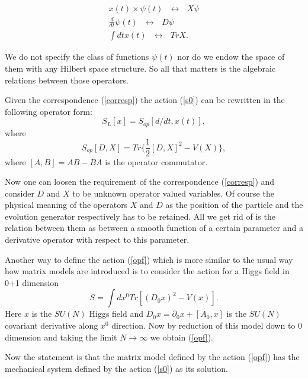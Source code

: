 \documentclass[a4paper,11pt]{article}
\begin{document}
\begin{eqnarray}
x(t)\times \psi(t) \ \ \ \leftrightarrow \ \ \ X \psi\nonumber \\
\frac{d}{dt} \psi(t) \ \ \ \leftrightarrow \ \ \ D \psi\nonumber \\
\int dt x(t) \ \ \ \leftrightarrow \ \ \ Tr X. \label{corresp}
\end{eqnarray}


 We do not specify the class of functions
$\psi(t)$ nor do we endow the space of them with any Hilbert space
structure. So all that matters is the algebraic relations between
those operators.



Given the correspondence (\ref{corresp})
 the action (\ref{s0}) can be rewritten in the
following operator form:
\begin{equation}
S_{L}[x]=S_{op}[d/dt,x(t)],
\end{equation}
where
\begin{equation}
S_{op}[D,X]=Tr \Big\{ \frac{1}{2}[D,X]^2 - V(X)    \Big\},
\label{opf}
\end{equation}
where $[A,B]=AB-BA$ is the operator commutator.

Now one can loosen  the requirement of the correspondence
(\ref{corresp}) and consider $D$ and $X$ to be unknown operator
valued variables. Of course the physical meaning of the operators
$X$ and $D$ as the position of the particle and the evolution
generator respectively has to be retained. All we get rid of is
the relation between them as between a smooth function of a
certain parameter and a derivative operator with respect to this
parameter.

Another way to define the action (\ref{opf}) which is more similar
to the usual way how matrix models are introduced is to consider
the action for a Higgs field in 0+1 dimension
\begin{equation}
S=\int d x^0 Tr[(D_0x)^2-V(x)]. \label{higgs}
\end{equation}
Here $x$ is the $SU(N)$ Higgs field and $D_0x=\partial_0x+[A_0,x]$
is the $SU(N)$ covariant derivative along $x^0$ direction. Now by
reduction of this model down to  0 dimension and taking the limit
$N \rightarrow \infty$ we obtain (\ref{opf}).

 Now the statement is that the matrix model defined by the action (\ref{opf})
 has the mechanical system defined by the action (\ref{s0}) as its solution.
\end{document}
